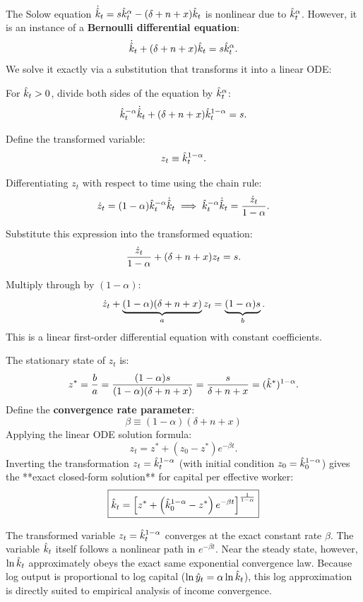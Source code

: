 \documentclass[11pt]{article}
\begin{document}
The Solow equation $\dot{\hat{k}}_t = s\hat{k}_t^\alpha - (\delta+n+x)\hat{k}_t$ is nonlinear due to $\hat{k}_t^\alpha$. However, it is an instance of a \textbf{Bernoulli differential equation}:
\[
\dot{\hat{k}}_t + (\delta+n+x)\hat{k}_t = s\hat{k}_t^\alpha.
\]
We solve it exactly via a substitution that transforms it into a linear ODE:
\begin{flatnum}
  \item For $\hat{k}_t > 0$, divide both sides of the equation by $\hat{k}_t^\alpha$:
  \[
  \hat{k}_t^{-\alpha}\dot{\hat{k}}_t + (\delta+n+x)\hat{k}_t^{1-\alpha} = s.
  \]
  \item Define the transformed variable:
  \[
  z_t \equiv \hat{k}_t^{1-\alpha}.
  \]
  \item Differentiating $z_t$ with respect to time using the chain rule:
  \[
  \dot{z}_t = (1-\alpha)\hat{k}_t^{-\alpha}\dot{\hat{k}}_t \implies \hat{k}_t^{-\alpha}\dot{\hat{k}}_t = \frac{\dot{z}_t}{1-\alpha}.
  \]
  \item Substitute this expression into the transformed equation:
  \[
  \frac{\dot{z}_t}{1-\alpha} + (\delta+n+x) z_t = s.
  \]
  \item Multiply through by $(1-\alpha)$:
  \[
  \dot{z}_t + \underbrace{(1-\alpha)(\delta+n+x)}_{a} z_t = \underbrace{(1-\alpha)s}_{b}.
  \]
  This is a linear first-order differential equation with constant coefficients.
\end{flatnum}

 The stationary state of $z_t$ is:
\[
z^* = \frac{b}{a} = \frac{(1-\alpha)s}{(1-\alpha)(\delta+n+x)} = \frac{s}{\delta+n+x} = (\hat{k}^*)^{1-\alpha}.
\]
Define the \textbf{convergence rate parameter}:
\[
\boxed{\beta \equiv (1-\alpha)(\delta+n+x)}
\]
Applying the linear ODE solution formula:
\[
z_t = z^* + (z_0 - z^*)e^{-\beta t}.
\]
Inverting the transformation $z_t = \hat{k}_t^{1-\alpha}$ (with initial condition $z_0 = \hat{k}_0^{1-\alpha}$) gives the **exact closed-form solution** for capital per effective worker:
\[
\boxed{\hat{k}_t = \left[z^* + \left(\hat{k}_0^{1-\alpha} - z^*\right)e^{-\beta t}\right]^{\frac{1}{1-\alpha}}}
\]

The transformed variable $z_t = \hat{k}_t^{1-\alpha}$ converges at the exact constant rate $\beta$. The variable $\hat{k}_t$ itself follows a nonlinear path in $e^{-\beta t}$. Near the steady state, however, $\ln\hat{k}_t$ approximately obeys the exact same exponential convergence law. Because log output is proportional to log capital ($\ln\hat{y}_t = \alpha\ln\hat{k}_t$), this log approximation is directly suited to empirical analysis of income convergence.
\end{document}
